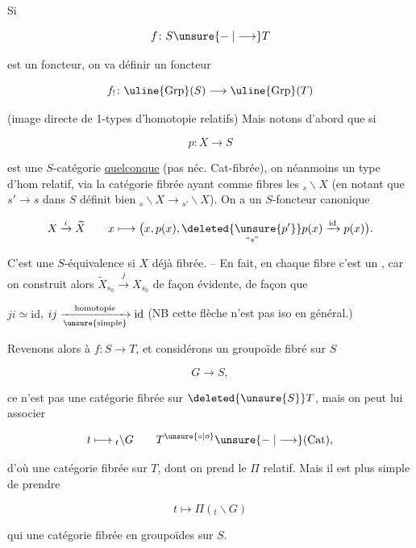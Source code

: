 
Si

\[
f\colon S\unsure{\mathrel{-}|\longrightarrow}T
\]

est un foncteur,  on va définir un foncteur

\[
f_!\colon\uline{\mathrm{Grp}}(S)\longrightarrow\uline{\mathrm{Grp}}(T)
\]

(image directe de 1-types d'homotopie relatifs) Mais notons d'abord que si

\[
p\colon X\longrightarrow S
\]

est une $S$-catégorie \uline{quelconque} (pas néc. Cat-fibrée), on  néanmoins un type d'hom relatif, via la catégorie fibrée  ayant comme fibres les ${}_{s}\backslash X$ (en notant que $s'\longrightarrow s$ dans $S$ définit bien ${}_{s}\backslash X\longrightarrow {}_{s'}\backslash X$).  On a un $S$-foncteur canonique


\[
X\xrightarrow{i}\widetilde X\qquad
x\longmapsto\bigl(x,p(x),\underset{\text{``}s\text{''}}{\deleted{\unsure{p'}}p(x)}\xrightarrow{\mathrm{id}}p(x)\bigr).
\]

 C'est une $S$-équivalence si $X$  déjà fibrée. -- En fait, en chaque fibre c'est un  , car on construit alors $\widetilde X_{s_0}\xrightarrow{j}X_{s_0}$ de façon évidente, de façon que


$ji\simeq\mathrm{id}$, $ij\xrightarrow[\text{\unsure{simple}}]{\text{homotopie}}\mathrm{id}$ (NB cette flèche n'est pas iso en général.)

Revenons alors à $f\colon S\longrightarrow T$, et considérons un groupoïde fibré sur $S$

\[
G\longrightarrow S,
\]

ce n'est pas une catégorie fibrée sur $\deleted{\unsure{S}}T$,  mais on peut lui associer

\[
t\longmapsto {}_{t}\backslash G\qquad T^{\unsure{\circ|o}}\unsure{\mathrel{-}|\longrightarrow}(\mathrm{Cat}),
\]

d'où une catégorie fibrée sur $T$, dont on prend le $\Pi$ relatif. Mais il est plus simple de prendre  

\[
t\longmapsto\Pi({}_{t}\backslash G)
\]

qui   une  catégorie fibrée en groupoïdes sur $S$.
